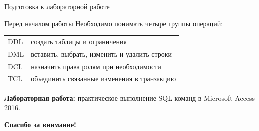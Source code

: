 \documentclass[aspectratio=169]{beamer}
\begin{document}
\begin{frame}{Подготовка к лабораторной работе}
\begin{block}{Перед началом работы}
Необходимо понимать четыре группы операций:
\end{block}

\begin{center}
\begin{tabular}{p{}|p{}}
\toprule
DDL & создать таблицы и ограничения\\
DML & вставить, выбрать, изменить и удалить строки\\
DCL & назначить права ролям при необходимости\\
TCL & объединить связанные изменения в транзакцию\\
\bottomrule
\end{tabular}
\end{center}

\vspace{0.3cm}
\textbf{Лабораторная работа:} практическое выполнение SQL-команд в Microsoft Access 2016.
\end{frame}

\begin{frame}
\thispagestyle{empty}
\vspace*{\fill}
\begin{center}
{\LARGE\bfseries Спасибо за внимание!}
\end{center}
\vspace*{\fill}
\end{frame}
\end{document}
